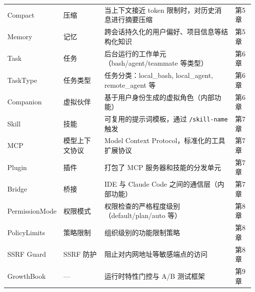 {\begin{longtable}{@{}p{2.8cm}p{1.8cm}p{6.2cm}p{1.2cm}@{}}
\addlinespace
Compact & 压缩 & 当上下文接近 token 限制时，对历史消息进行摘要压缩 & 第5章 \\
\addlinespace
Memory & 记忆 & 跨会话持久化的用户偏好、项目信息等结构化知识 & 第5章 \\
\addlinespace
Task & 任务 & 后台运行的工作单元（bash/agent/teammate 等类型） & 第6章 \\
\addlinespace
TaskType & 任务类型 & 任务分类：local\_bash, local\_agent, remote\_agent 等 & 第6章 \\
\addlinespace
Companion & 虚拟伙伴 & 基于用户身份生成的虚拟角色（内部功能） & 第6章 \\
\addlinespace
Skill & 技能 & 可复用的提示词模板，通过 \texttt{/skill-name} 触发 & 第7章 \\
\addlinespace
MCP & 模型上下文协议 & Model Context Protocol，标准化的工具扩展协议 & 第7章 \\
\addlinespace
Plugin & 插件 & 打包了 MCP 服务器和技能的分发单元 & 第7章 \\
\addlinespace
Bridge & 桥接 & IDE 与 Claude Code 之间的通信层（内部功能） & 第7章 \\
\addlinespace
PermissionMode & 权限模式 & 权限检查的严格程度级别（default/plan/auto 等） & 第8章 \\
\addlinespace
PolicyLimits & 策略限制 & 组织级别的功能限制策略 & 第8章 \\
\addlinespace
SSRF Guard & SSRF 防护 & 阻止对内网地址等敏感端点的访问 & 第8章 \\
\addlinespace
GrowthBook & — & 运行时特性门控与 A/B 测试框架 & 第9章 \\
\bottomrule
\end{longtable}
}
